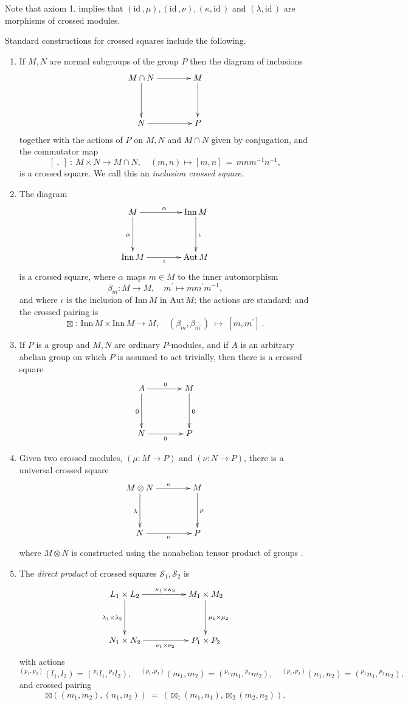 \documentclass{ws-ijac}
\newcommand{\calS}{\mathcal{S}}
\newcommand{\Aut}   {\mathrm{Aut}}
\newcommand{\id}    {\mathrm{id}\,}
\newcommand{\Inn}   {\mathrm{Inn}}
\newcommand{\bt}      {\boxtimes}
\begin{document}
\noindent 
Note that axiom 1. implies that $(\id,\mu), (\id,\nu), (\kappa,\id)$ 
and $(\lambda,\id)$ are morphisms of crossed modules. 

\medskip 
\noindent 
Standard constructions for crossed squares include the following.
\begin{enumerate}
\item 
If $M,N$ are normal subgroups of the group $P$ then the diagram of inclusions
\[
\xymatrix@R=40pt@C=40pt
{ M \cap N \ar[r]^(0.6){} \ar[d]_{}  
	& M \ar[d]^{} \\
	N \ar[r]_{}  
	& P }
\] 
\noindent together with the actions of $P$ on $M,N$ and $M\cap N$ 
given by conjugation, and the commutator map 
\[
[~,~] ~:~ M\times N \rightarrow M\cap N,\quad 
(m,n)\mapsto [m,n] \,=\, mnm^{-1}n^{-1}, 
\] 
is a crossed square. 
We call this an \emph{inclusion crossed square}.
\item 
The diagram
\[
\xymatrix@R=40pt@C=40pt
{ M \ar[r]^{\alpha} \ar[d]_{\alpha} 
	& \Inn\,M \ar[d]^{\iota} \\
	\Inn\,M \ar[r]_{\iota} 
	& \Aut\,M }
\] 
\noindent is a crossed square, 
where $\alpha $ maps $m\in M$ to the inner automorphism%
\[
\beta_{m} : M \rightarrow M,\quad 
m^{\prime}\mapsto mm^{\prime}m^{-1}, 
\]
and where $\iota $ is the inclusion of $\Inn\,M$ in $\Aut\,M$; 
the actions are standard; and the crossed pairing is
\[
\bt ~:~ \Inn\,M \times \Inn\,M \rightarrow M,\quad 
(\beta_{m},\beta_{m^{\prime}}) \;\mapsto\; [m,m^{\prime}]~.
\]
\item 
If $P$ is a group and $M,N$ are ordinary $P$-modules, 
and if $A$ is an arbitrary abelian group on which $P$ is assumed to act trivially, 
then there is a crossed square
\[
\xymatrix@R=40pt@C=40pt
{ A \ar[r]^{0} \ar[d]_{0}  
	& M \ar[d]^{0} \\
	N \ar[r]_{0} 
	& P }
\]
\item 
Given two crossed modules, $(\mu : M \rightarrow P)$ and $(\nu : N \rightarrow P)$, 
there is a universal crossed square 
\[
\xymatrix@R=40pt@C=40pt
{ M \otimes N \ar[d]_{\lambda} \ar[r]^{\kappa} 
	& M \ar[d]^{\mu} \\ 
	N \ar[r]_{\nu} 
	& P } 
\] 
where $M \otimes N$ is constructed using the nonabelian tensor product of groups 
\cite{brown-loday}. 
\item
The \emph{direct product} of crossed squares $\calS_1,\calS_2$ is 
\[
\xymatrix@R=40pt@C=50pt
{ L_1 \times L_2 \ar[r]^{\kappa_1 \times \kappa_2} 
                 \ar[d]_{\lambda_1 \times \lambda_2}  
	& M_1 \times M_2 \ar[d]^{\mu_1 \times \mu_2} \\
	N_1 \times N_2 \ar[r]_{\nu_1 \times \nu_2} 
	& P_1 \times P_2 }
\] 
with actions 
\[
{}^{(p_1,p_2)}(l_1,l_2) = \left({}^{p_1}l_1,{}^{p_2}l_2\right), \quad 
{}^{(p_1,p_2)}(m_1,m_2) = \left({}^{p_1}m_1,{}^{p_2}m_2\right), \quad 
{}^{(p_1,p_2)}(n_1,n_2) = \left({}^{p_1}n_1,{}^{p_2}n_2\right),  
\]
and crossed pairing 
\[
\bt\left((m_1,m_2),(n_1,n_2)\right) ~=~ \left(\bt_1(m_1,n_1),\bt_2(m_2,n_2)\right). 
\]
\end{enumerate}
\end{document}
